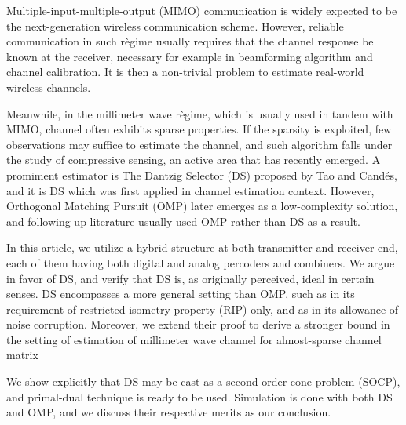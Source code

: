
\starttitle [title={Abstract}]

Multiple-input-multiple-output (MIMO) communication is widely expected to be the next-generation wireless communication scheme.
However, reliable communication in such r\`egime usually requires that the channel response be known at the receiver, necessary for example in beamforming algorithm and channel calibration.
It is then a non-trivial problem to estimate real-world wireless channels.

Meanwhile, in the millimeter wave r\`egime, which is usually used in tandem with MIMO, channel often exhibits sparse properties.
If the sparsity is exploited, few observations may suffice to estimate the channel, and such algorithm falls under the study of compressive sensing, an active area that has recently emerged.
A promiment estimator is The Dantzig Selector (DS) proposed by Tao and Cand\'es, and it is DS which was first applied in channel estimation context.
However, Orthogonal Matching Pursuit (OMP) later emerges as a low-complexity solution, and following-up literature usually used OMP rather than DS as a result.

In this article, we utilize a hybrid structure at both transmitter and receiver end, each of them having both digital and analog percoders and combiners.
We argue in favor of DS, and verify that DS is, as originally perceived, ideal in certain senses.
DS encompasses a more general setting than OMP, such as in its requirement of restricted isometry property (RIP) only, and as in its allowance of noise corruption.
Moreover, we extend their proof to derive a stronger bound in the setting of estimation of millimeter wave channel for almost-sparse channel matrix

We show explicitly that DS may be cast as a second order cone problem (SOCP), and primal-dual technique is ready to be used.
Simulation is done with both DS and OMP, and we discuss their respective merits as our conclusion.


\stoptitle

